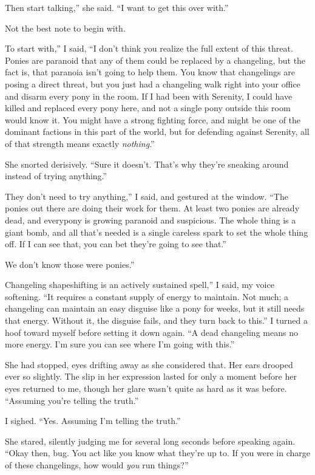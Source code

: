 \leavevmode{}Then start talking,” she said. “I want to get this over with.”

Not the best note to begin with.

\leavevmode{}To start with,” I said, “I don’t think you realize the full extent of this threat. Ponies are paranoid that any of them could be replaced by a changeling, but the fact is, that paranoia isn’t going to help them. You know that changelings are posing a direct threat, but you just had a changeling walk right into your office and disarm every pony in the room. If I had been with Serenity, I could have killed and replaced every pony here, and not a single pony outside this room would know it. You might have a strong fighting force, and might be one of the dominant factions in this part of the world, but for defending against Serenity, all of that strength means exactly \textit{nothing}.”

She snorted derisively. “Sure it doesn’t. That’s why they’re sneaking around instead of trying anything.”

\leavevmode{}They don’t need to try anything,” I said, and gestured at the window. “The ponies out there are doing their work for them. At least two ponies are already dead, and everypony is growing paranoid and suspicious. The whole thing is a giant bomb, and all that’s needed is a single careless spark to set the whole thing off. If I can see that, you can bet they’re going to see that.”

\leavevmode{}We don’t know those were ponies.”

\leavevmode{}Changeling shapeshifting is an actively sustained spell,” I said, my voice softening. “It requires a constant supply of energy to maintain. Not much; a changeling can maintain an easy disguise like a pony for weeks, but it still needs that energy. Without it, the disguise fails, and they turn back to this.” I turned a hoof toward myself before setting it down again. “A dead changeling means no more energy. I’m sure you can see where I’m going with this.”

She had stopped, eyes drifting away as she considered that. Her ears drooped ever so slightly. The slip in her expression lasted for only a moment before her eyes returned to me, though her glare wasn’t quite as hard as it was before. “Assuming you’re telling the truth.”

I sighed. “Yes. Assuming I’m telling the truth.”

She stared, silently judging me for several long seconds before speaking again. “Okay then, bug. You act like you know what they’re up to. If you were in charge of these changelings, how would \textit{you} run things?”

